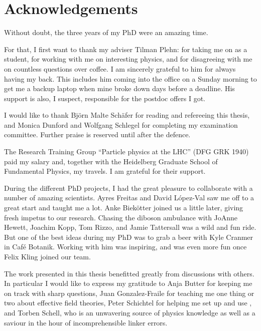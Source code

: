 
\chapter*{Acknowledgements}

Without doubt, the three years of my PhD were an amazing time.

For that, I first want to thank my adviser Tilman Plehn: for taking me
on as a student, for working with me on interesting physics, and for
disagreeing with me on countless questions over coffee. I am sincerely
grateful to him for always having my back. This includes him coming
into the office on a Sunday morning to get me a backup laptop when
mine broke down days before a deadline. His support is also, I
suspect, responsible for the postdoc offers I got.
%
%

I would like to thank Bj\"orn Malte Sch\"afer for reading and
refereeing this thesis, and Monica Dunford and Wolfgang Schlegel for
completing my examination committee. Further praise is reserved until
after the defence.

The Research Training Group ``Particle physics at the LHC'' (DFG GRK
1940) paid my salary and, together with the Heidelberg Graduate School
of Fundamental Physics, my travels. I am grateful for their support.

During the different PhD projects, I had the great pleasure to
collaborate with a number of amazing scientists. Ayres Freitas and
David L\'opez-Val saw me off to a great start and taught me a
lot. Anke Biek\"otter joined us a little later, giving fresh impetus
to our research. Chasing the diboson ambulance with JoAnne Hewett,
Joachim Kopp, Tom Rizzo, and Jamie Tattersall was a wild and fun
ride. But one of the best ideas during my PhD was to grab a beer with
Kyle Cranmer in Caf\'e Botanik. Working with him was inspiring, and
was even more fun once Felix Kling joined our team.

The work presented in this thesis benefitted greatly from discussions
with others. In particular I would like to express my gratitude to
Anja Butter for keeping me on track with sharp questions, Juan
Gonzalez-Fraile for teaching me one thing or two about effective field
theories, Peter Schichtel for helping me set up and use
, and Torben Schell, who is an unwavering source of
physics knowledge as well as a saviour in the hour of incomprehensible
linker errors.

